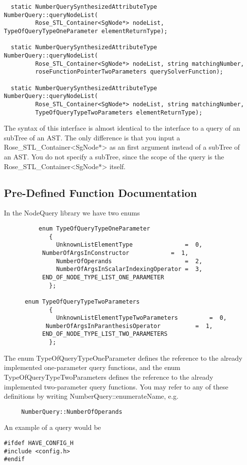 {\begin{verbatim}
  static NumberQuerySynthesizedAttributeType NumberQuery::queryNodeList(
         Rose_STL_Container<SgNode*> nodeList, TypeOfQueryTypeOneParameter elementReturnType);
	  
  static NumberQuerySynthesizedAttributeType NumberQuery::queryNodeList(
         Rose_STL_Container<SgNode*> nodeList, string matchingNumber, 
         roseFunctionPointerTwoParameters querySolverFunction);  

  static NumberQuerySynthesizedAttributeType NumberQuery::queryNodeList(
         Rose_STL_Container<SgNode*> nodeList, string matchingNumber, 
         TypeOfQueryTypeTwoParameters elementReturnType);
\end{verbatim}
The syntax of this interface is almost identical to the interface to a query
of an subTree of an AST.  The only difference is that you input a
Rose_STL_Container<SgNode*> as an first argument instead of a subTree of an AST. You
do not specify a subTree, since the scope of the query is the Rose_STL_Container<SgNode*> itself.  


\subsection{Pre-Defined Function Documentation}
\label{FunctionDocumentation}

In the NodeQuery library we have two enums
\begin{verbatim}
          enum TypeOfQueryTypeOneParameter
             {
               UnknownListElementType               =  0,
	       NumberOfArgsInConstructor            =  1,
               NumberOfOperands                     =  2,
               NumberOfArgsInScalarIndexingOperator =  3,
	       END_OF_NODE_TYPE_LIST_ONE_PARAMETER
             };
	 
	  enum TypeOfQueryTypeTwoParameters
             {
               UnknownListElementTypeTwoParameters         =  0,
	        NumberOfArgsInParanthesisOperator          =  1,
	       END_OF_NODE_TYPE_LIST_TWO_PARAMETERS
             };
\end{verbatim}
The enum TypeOfQueryTypeOneParameter defines the reference to the
already implemented one-parameter query functions, and the enum 
TypeOfQueryTypeTwoParameters defines the reference to the already
implemented two-parameter query functions. You may refer to any of
these definitions by writing NumberQuery::enumerateName, e.g.
\begin{verbatim}
     NumberQuery::NumberOfOperands
\end{verbatim}
An example of a query would be 
\begin{verbatim}
#ifdef HAVE_CONFIG_H
#include <config.h>
#endif


\end{verbatim}}
